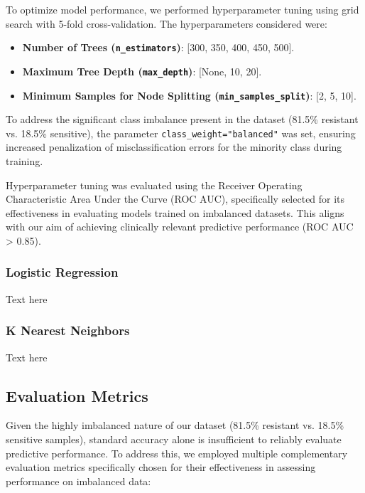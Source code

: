 \documentclass{article}
\begin{document}
To optimize model performance, we performed hyperparameter tuning using grid search with 5-fold cross-validation. The hyperparameters considered were:

\begin{itemize}
    \item \textbf{Number of Trees (\texttt{n\_estimators})}: [300, 350, 400, 450, 500].
    \item \textbf{Maximum Tree Depth (\texttt{max\_depth})}: [None, 10, 20].
    \item \textbf{Minimum Samples for Node Splitting (\texttt{min\_samples\_split})}: [2, 5, 10].
\end{itemize}

To address the significant class imbalance present in the dataset (81.5\% resistant vs. 18.5\% sensitive), the parameter \texttt{class\_weight="balanced"} was set, ensuring increased penalization of misclassification errors for the minority class during training.

Hyperparameter tuning was evaluated using the Receiver Operating Characteristic Area Under the Curve (ROC AUC), specifically selected for its effectiveness in evaluating models trained on imbalanced datasets. This aligns with our aim of achieving clinically relevant predictive performance (ROC AUC > 0.85).

\subsubsection{Logistic Regression}
Text here

\subsubsection{K Nearest Neighbors}
Text here


\subsection{Evaluation Metrics}

Given the highly imbalanced nature of our dataset (81.5\% resistant vs. 18.5\% sensitive samples), standard accuracy alone is insufficient to reliably evaluate predictive performance. To address this, we employed multiple complementary evaluation metrics specifically chosen for their effectiveness in assessing performance on imbalanced data:
\end{document}
